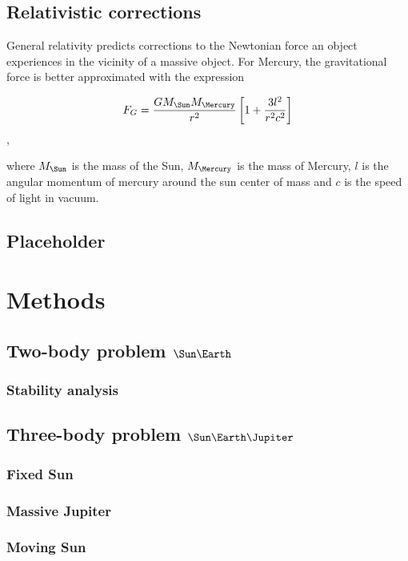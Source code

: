 \documentclass[10pt]{article}
\begin{document}
\begin{multicols}{2}
\subsection{Relativistic corrections}
General relativity predicts corrections to the Newtonian force an object
experiences in the vicinity of a massive object. For Mercury, the
gravitational force is better approximated with the expression

\begin{equation}
    F_G =
    \frac{GM_{\text{\Sun}}M_{\text{\Mercury}}}{r^2}\left[1+\frac{3l^2}{r^2
    c^2}\right] 
\end{equation},

where $M_{\text{\Sun}}$ is the mass of the Sun, $M_{\text{\Mercury}}$ is the
mass of Mercury, $l$ is the angular momentum of mercury around the sun
center of mass and $c$ is the speed of light in vacuum.

\subsection{Placeholder}


\section{Methods}

\subsection{Two-body problem $\Sun\Earth$} 
\subsubsection{Stability analysis}
\subsection{Three-body problem $\Sun\Earth\Jupiter$} 
\subsubsection{Fixed Sun }
\subsubsection{Massive Jupiter }
\subsubsection{Moving Sun }

\end{multicols}
\end{document}

